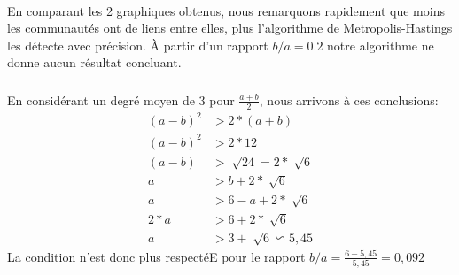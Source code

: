 \paragraph*{}
En comparant les 2 graphiques obtenus, nous remarquons rapidement que moins les communautés
ont de liens entre elles, plus l'algorithme de Metropolis-Hastings les détecte avec 
précision. À partir d'un rapport $b/a = 0.2 $ notre algorithme ne donne aucun
résultat concluant.

\subsubsection{}
\paragraph*{}
En considérant un degré moyen de 3 pour $\frac{a+b}{2}$, nous arrivons à ces conclusions:
\begin{align*}
    (a-b)^2 &> 2*(a+b)\\
    (a-b)^2 &> 2*12\\
    (a-b)&>\sqrt[]{24}=2*\sqrt[]{6}\\
    a&>b+2*\sqrt[]{6}\\
    a&>6-a+2*\sqrt[]{6}\\
    2*a&>6+2*\sqrt[]{6}\\
    a&>3+\sqrt[]{6}\backsimeq 5,45
\end{align*}
La condition n'est donc plus respectéE pour le rapport $b/a = \frac{6-5,45}{5,45}= 0,092$